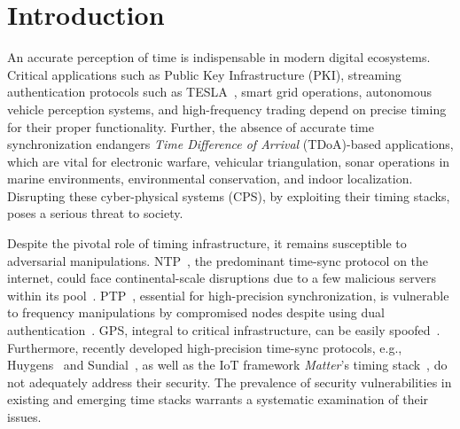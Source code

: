 \section{Introduction}\label{sec:introduction}
An accurate perception of time is indispensable in modern digital ecosystems. Critical applications such as Public Key Infrastructure (PKI)\cite{time-stack-abouttime}, streaming authentication protocols such as TESLA~\cite{tesla-cryptography}, smart grid operations\cite{intro-tech-report-smart-grid, intro-smart-grid-pmu-attack}, autonomous vehicle perception systems\cite{hardware-chronos-slam-attack}, and high-frequency trading\cite{intro-high-frequency-trading} depend on precise timing for their proper functionality. Further, the absence of accurate time synchronization endangers \textit{Time Difference of Arrival} (TDoA)-based applications, which are vital for electronic warfare\cite{intro-electronic-warfare}, vehicular triangulation\cite{intro-vehicle}, sonar operations in marine environments\cite{intro-sonar}, environmental conservation\cite{intro-gunshot-localization}, and indoor localization\cite{intro-indoor-localization}. Disrupting these cyber-physical systems (CPS), by exploiting their timing stacks, poses a serious threat to society.

Despite the pivotal role of timing infrastructure, it remains susceptible to adversarial manipulations. NTP~\cite{ntpv4-rfc}, the predominant time-sync protocol on the internet, could face continental-scale disruptions due to a few malicious servers within its pool~\cite{shark-ntp-pool}. PTP~\cite{ptp-std-doc}, essential for high-precision synchronization, is vulnerable to frequency manipulations by compromised nodes despite using dual authentication~\cite{net-sync-ptp-covert-channel}. GPS, integral to critical infrastructure, can be easily spoofed~\cite{gps-spoofing-fundamentals}. Furthermore, recently developed high-precision time-sync protocols, e.g., Huygens~\cite{huygens} and Sundial~\cite{sundial}, as well as the IoT framework \textit{Matter}'s timing stack~\cite{matter}, do not adequately address their security. The prevalence of security vulnerabilities in existing and emerging time stacks warrants a systematic examination of their issues.

